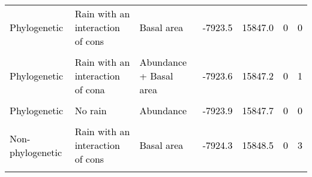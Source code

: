 \documentclass[
  12pt,
  letterpaper,
  DIV=11,
  numbers=noendperiod]{scrartcl}
\begin{document}
\begin{table}[H]
{\begin{tabular}[t]{lllllll}
\addlinespace
\textcolor{black}{Phylogenetic} & \textcolor{black}{Rain with an interaction of cons} & \textcolor{black}{Basal area} & \textcolor{black}{-7923.5} & \textcolor{black}{15847.0} & \textcolor{black}{0} & \textcolor{black}{0}\\
\cellcolor{gray!6}{\textcolor{black}{Non-phylogenetic}} & \cellcolor{gray!6}{\textcolor{black}{Rain without interactions}} & \cellcolor{gray!6}{\textcolor{black}{Basal area}} & \cellcolor{gray!6}{\textcolor{black}{-7923.6}} & \cellcolor{gray!6}{\textcolor{black}{15847.2}} & \cellcolor{gray!6}{\textcolor{black}{0}} & \cellcolor{gray!6}{\textcolor{black}{0}}\\
\textcolor{black}{Phylogenetic} & \textcolor{black}{Rain with an interaction of cona} & \textcolor{black}{Abundance + Basal area} & \textcolor{black}{-7923.6} & \textcolor{black}{15847.2} & \textcolor{black}{0} & \textcolor{black}{1}\\
\cellcolor{gray!6}{\textcolor{black}{Non-phylogenetic}} & \cellcolor{gray!6}{\textcolor{black}{Rain with an interaction of cons and cona}} & \cellcolor{gray!6}{\textcolor{black}{Basal area}} & \cellcolor{gray!6}{\textcolor{black}{-7923.7}} & \cellcolor{gray!6}{\textcolor{black}{15847.4}} & \cellcolor{gray!6}{\textcolor{black}{0}} & \cellcolor{gray!6}{\textcolor{black}{0}}\\
\textcolor{black}{Phylogenetic} & \textcolor{black}{No rain} & \textcolor{black}{Abundance} & \textcolor{black}{-7923.9} & \textcolor{black}{15847.7} & \textcolor{black}{0} & \textcolor{black}{0}\\
\addlinespace
\cellcolor{gray!6}{\textcolor{black}{Phylogenetic}} & \cellcolor{gray!6}{\textcolor{black}{Rain with an interaction of cons}} & \cellcolor{gray!6}{\textcolor{black}{Abundance}} & \cellcolor{gray!6}{\textcolor{black}{-7924.0}} & \cellcolor{gray!6}{\textcolor{black}{15848.0}} & \cellcolor{gray!6}{\textcolor{black}{0}} & \cellcolor{gray!6}{\textcolor{black}{0}}\\
\textcolor{black}{Non-phylogenetic} & \textcolor{black}{Rain with an interaction of cons} & \textcolor{black}{Basal area} & \textcolor{black}{-7924.3} & \textcolor{black}{15848.5} & \textcolor{black}{0} & \textcolor{black}{3}\\
\cellcolor{gray!6}{\textcolor{black}{Phylogenetic}} & \cellcolor{gray!6}{\textcolor{black}{Rain without interactions}} & \cellcolor{gray!6}{\textcolor{black}{Abundance + Basal area}} & \cellcolor{gray!6}{\textcolor{black}{-7924.3}} & \cellcolor{gray!6}{\textcolor{black}{15848.6}} & \cellcolor{gray!6}{\textcolor{black}{0}} & \cellcolor{gray!6}{\textcolor{black}{1}}\\

\end{tabular}}
\end{table}
\end{document}
